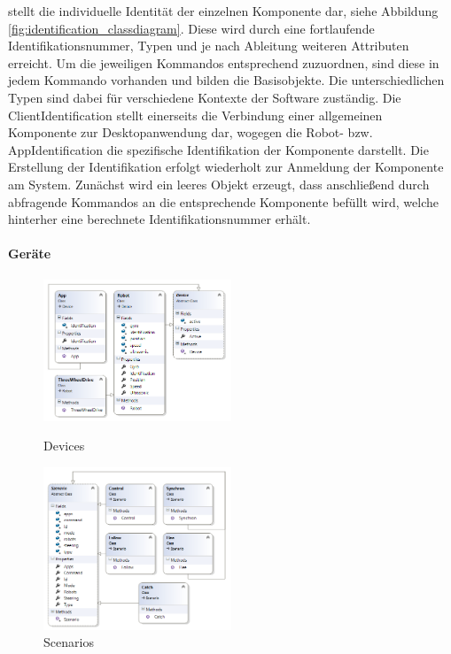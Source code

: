 stellt die individuelle Identität der einzelnen Komponente dar, siehe Abbildung \ref{fig:identification_classdiagram}. Diese wird durch eine fortlaufende Identifikationsnummer, Typen und je nach Ableitung weiteren Attributen erreicht. Um die jeweiligen Kommandos entsprechend zuzuordnen, sind diese in jedem Kommando vorhanden und bilden die Basisobjekte. Die unterschiedlichen Typen sind dabei für verschiedene Kontexte der Software zuständig. Die ClientIdentification stellt einerseits die Verbindung einer allgemeinen Komponente zur Desktopanwendung dar, wogegen die Robot- bzw. AppIdentification die spezifische Identifikation der Komponente darstellt. Die Erstellung der Identifikation erfolgt wiederholt zur Anmeldung der Komponente am System. Zunächst wird ein leeres Objekt erzeugt, dass anschließend durch abfragende Kommandos an die entsprechende Komponente befüllt wird, welche hinterher eine berechnete Identifikationsnummer erhält.

\newpage
\paragraph{Geräte}

\begin{figure}
	\begin{center}
		\includegraphics[width=0.5\textwidth]{images/uml/devices.png}
	\end{center}
	\caption{Devices}
	\label{fig:devices_classdiagram}
	\begin{center}
		\includegraphics[width=0.5\textwidth]{images/uml/szenarios.png}
	\end{center}
	\caption{Scenarios}
	\label{fig:szenarios_classdiagram}
\end{figure}

